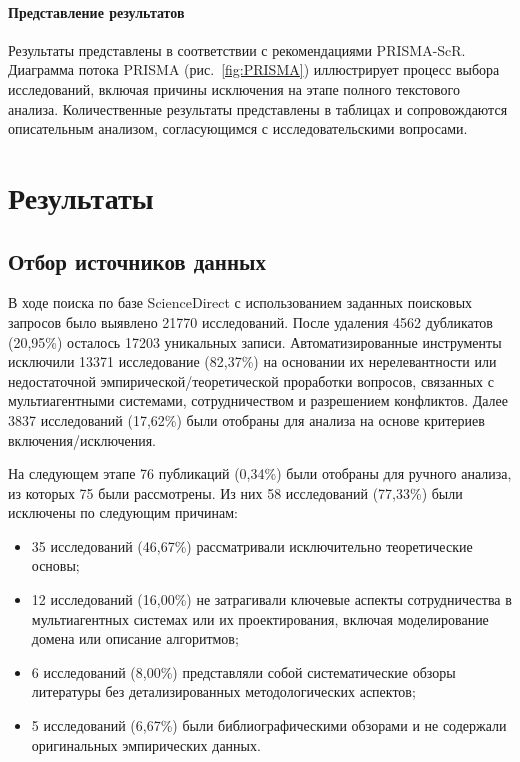 \documentclass[%
]{ittmm}
\begin{document}
\paragraph{Представление результатов}

Результаты представлены в соответствии с рекомендациями PRISMA-ScR.
Диаграмма потока PRISMA (рис.~\ref{fig:PRISMA}) иллюстрирует процесс выбора исследований,
включая причины исключения на этапе полного текстового анализа.
Количественные результаты представлены в таблицах и сопровождаются
описательным анализом, согласующимся с исследовательскими вопросами.

\section{Результаты}

\subsection{Отбор источников данных}

В ходе поиска по базе ScienceDirect с использованием заданных поисковых запросов было выявлено 21770 исследований.
После удаления 4562 дубликатов (20,95\%) осталось 17203 уникальных записи.
Автоматизированные инструменты исключили 13371 исследование (82,37\%)
на основании их нерелевантности или недостаточной эмпирической/теоретической проработки вопросов,
связанных с мультиагентными системами, сотрудничеством и разрешением конфликтов.
Далее 3837 исследований (17,62\%) были отобраны для анализа на основе критериев включения/исключения.

На следующем этапе 76 публикаций (0,34\%) были отобраны для ручного анализа, из которых 75 были рассмотрены.
Из них 58 исследований (77,33\%) были исключены по следующим причинам:

\begin{itemize}
  \item 35 исследований (46,67\%) рассматривали исключительно теоретические основы;
  \item 12 исследований (16,00\%) не затрагивали ключевые аспекты сотрудничества в мультиагентных системах
    или их проектирования, включая моделирование домена или описание алгоритмов;
  \item 6 исследований (8,00\%) представляли собой систематические обзоры литературы без детализированных методологических аспектов;
  \item 5 исследований (6,67\%) были библиографическими обзорами и не содержали оригинальных эмпирических данных.
\end{itemize}
\end{document}
